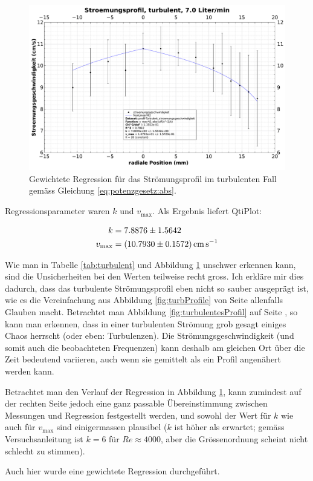 \clearpage
\begin{samepage}
\begin{figure}[h!t]
    \centering
    \includegraphics[width=\textwidth]{images/profil-turbulent.pdf}
    \caption{%
        Gewichtete Regression f\"ur das  Str\"omungsprofil im turbulenten Fall
        gem\"ass Gleichung \ref{eq:potenzgesetz:abs}.
    }
    \label{fig:profile:turb}
\end{figure}

Regressionsparameter  waren $k$  und $v_{\mathrm{max}}$. Als  Ergebnis liefert
QtiPlot:

\begin{align}
    \label{eq:profile:turb:regression:results:k}
    k &= 7.8876 \pm 1.5642
    \\
    \label{eq:profile:turb:regression:results:vmax}
    v_{\mathrm{max}} &= \SI{10.793 \pm 0.1572}{\centi\meter\per\second}
\end{align}

Wie man  in Tabelle  \ref{tab:turbulent} und  Abbildung \ref{fig:profile:turb}
unschwer erkennen kann, sind die Unsicherheiten bei den Werten teilweise recht
gross. Ich erkl\"are  mir dies dadurch, dass  das turbulente Str\"omungsprofil
eben  nicht  so  sauber  ausgepr\"agt   ist,  wie  es  die  Vereinfachung  aus
Abbildung \ref{fig:turbProfile} von Seite \pageref{fig:turbProfile} allenfalls
Glauben  macht. Betrachtet   man  Abbildung   \ref{fig:turbulentesProfil}  auf
Seite  \pageref{fig:turbulentesProfil},   so  kann   man  erkennen,   dass  in
einer  turbulenten  Str\"omung  grob   gesagt  einiges  Chaos  herrscht  (oder
eben: Turbulenzen). Die   Str\"omungsgeschwindigkeit  (und   somit  auch   die
beobachteten  Frequenzen)  kann  deshalb  am  gleichen  Ort  \"uber  die  Zeit
bedeutend  variieren, auch  wenn  sie gemittelt  als  ein Profil  angen\"ahert
werden kann.

Betrachtet man den Verlauf der Regression in Abbildung \ref{fig:profile:turb},
kann   zumindest   auf  der   rechten   Seite   jedoch  eine   ganz   passable
\"Ubereinstimmung zwischen  Messungen und Regression festgestellt  werden, und
sowohl der Wert f\"ur $k$ wie auch f\"ur $v_{\mathrm{max}}$ sind einigermassen
plausibel ($k$ ist  h\"oher als erwartet; gem\"ass Versuchsanleitung  ist $k =
6$ f\"ur $\mathit{Re}  \approx 4000$, aber die  Gr\"ossenordnung scheint nicht
schlecht zu stimmen).

Auch hier wurde eine gewichtete Regression durchgef\"uhrt.
\end{samepage}
